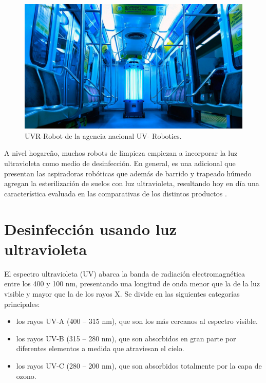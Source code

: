 \begin{figure}[h]
	\centering
	\includegraphics[width=12cm]{./Figures/uvrobot.jpeg}
	\caption{UVR-Robot de la agencia nacional UV- Robotics\protect\footnotemark.}
	\label{fig:uvrobot}
\end{figure}

A nivel hogareño, muchos robots de limpieza empiezan a incorporar la luz ultravioleta como medio de desinfección. En general, es una adicional que presentan las aspiradoras robóticas que además de barrido y trapeado húmedo agregan la esterilización de suelos con luz ultravioleta, resultando hoy en día una característica evaluada en las comparativas de los distintos productos \citep{Didcom}. 



\section{Desinfección usando luz ultravioleta}

El espectro ultravioleta (UV) abarca la banda de radiación electromagnética entre los 400 y 100 nm, presentando una longitud de onda menor que la de la luz visible y mayor que la de los rayos X.  Se divide en las siguientes categorías principales:

\begin{itemize}
	\item los rayos UV-A (400 – 315 nm), que son los más cercanos al espectro visible.
	\item los rayos UV-B (315 – 280 nm), que son absorbidos en gran parte por diferentes elementos a medida que atraviesan el cielo.
	\item los rayos UV-C (280 – 200 nm), que son absorbidos totalmente por la capa de ozono.
\end{itemize}


